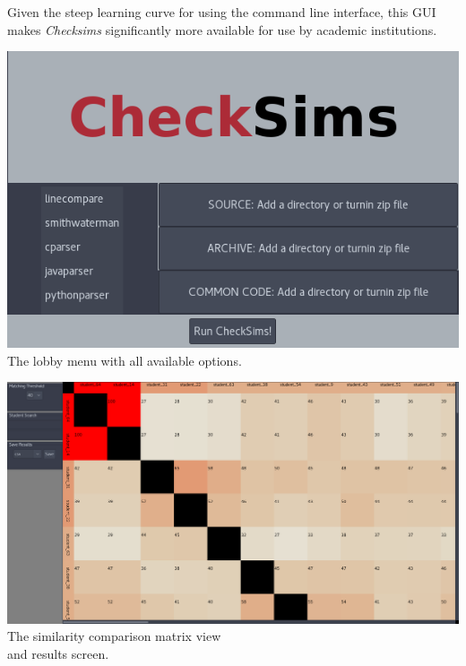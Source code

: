 \documentclass[landscape,a0paper,fontscale=0.285]{baposter}
\begin{document}
\begin{poster}
{    Given the steep learning curve for using the command line interface, this GUI
    makes \textit{Checksims} significantly more available for use by academic
    institutions.

    \parbox[c][0.35\linewidth][b]{0.48\linewidth}{
      \includegraphics[width=0.9\linewidth]{initial_run.png} \\
      The lobby menu with all available options.
    }
    \parbox[c][0.35\linewidth][b]{0.48\linewidth}{
      \includegraphics[width=0.9\linewidth]{demo_screen.png} \\
      The similarity comparison matrix view \\
      and results screen.
    }
}


\end{poster}
\end{document}
